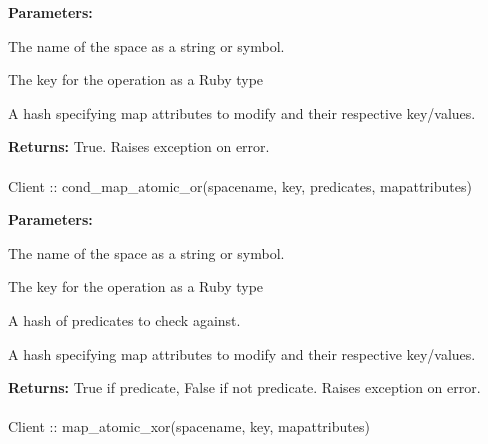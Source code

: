 \noindent\textbf{Parameters:}
\begin{description}[labelindent=\widthof{{\code{mapattributes}}},leftmargin=*,noitemsep,nolistsep,align=right]
\item[\code{spacename}] The name of the space as a string or symbol.
\item[\code{key}] The key for the operation as a Ruby type
\item[\code{mapattributes}] A hash specifying map attributes to modify and their respective key/values.
\end{description}

\noindent\textbf{Returns:}
True.  Raises exception on error.

\paragraph{}
\begin{ccode}
Client :: cond_map_atomic_or(spacename, key, predicates, mapattributes)
\end{ccode}
\funcdesc 

\noindent\textbf{Parameters:}
\begin{description}[labelindent=\widthof{{\code{mapattributes}}},leftmargin=*,noitemsep,nolistsep,align=right]
\item[\code{spacename}] The name of the space as a string or symbol.
\item[\code{key}] The key for the operation as a Ruby type
\item[\code{predicates}] A hash of predicates to check against.
\item[\code{mapattributes}] A hash specifying map attributes to modify and their respective key/values.
\end{description}

\noindent\textbf{Returns:}
True if predicate, False if not predicate.  Raises exception on error.

\paragraph{}
\begin{ccode}
Client :: map_atomic_xor(spacename, key, mapattributes)
\end{ccode}
\funcdesc 

